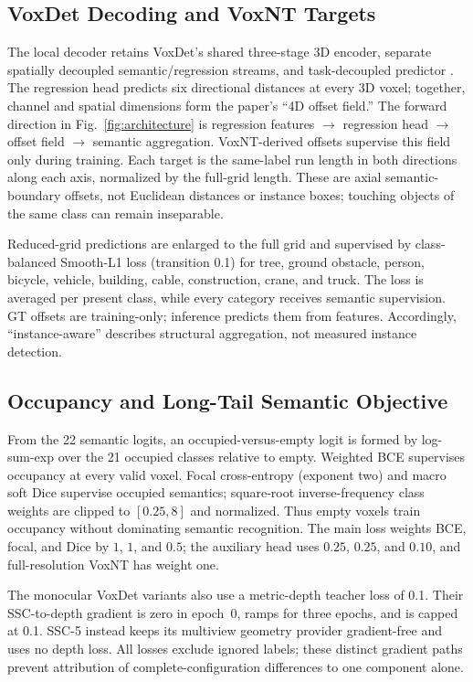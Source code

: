 \subsection{VoxDet Decoding and VoxNT Targets}
The local decoder retains VoxDet's shared three-stage 3D encoder, separate spatially decoupled semantic/regression streams, and task-decoupled predictor \cite{li2025voxdet}. The regression head predicts six directional distances at every 3D voxel; together, channel and spatial dimensions form the paper's ``4D offset field.'' The forward direction in Fig.~\ref{fig:architecture} is regression features $\rightarrow$ regression head $\rightarrow$ offset field $\rightarrow$ semantic aggregation. VoxNT-derived offsets supervise this field only during training. Each target is the same-label run length in both directions along each axis, normalized by the full-grid length. These are axial semantic-boundary offsets, not Euclidean distances or instance boxes; touching objects of the same class can remain inseparable.

Reduced-grid predictions are enlarged to the full grid and supervised by class-balanced Smooth-L1 loss (transition 0.1) for tree, ground obstacle, person, bicycle, vehicle, building, cable, construction, crane, and truck. The loss is averaged per present class, while every category receives semantic supervision. GT offsets are training-only; inference predicts them from features. Accordingly, ``instance-aware'' describes structural aggregation, not measured instance detection.

\subsection{Occupancy and Long-Tail Semantic Objective}
From the 22 semantic logits, an occupied-versus-empty logit is formed by log-sum-exp over the 21 occupied classes relative to empty. Weighted BCE supervises occupancy at every valid voxel. Focal cross-entropy (exponent two) and macro soft Dice supervise occupied semantics; square-root inverse-frequency class weights are clipped to $[0.25,8]$ and normalized. Thus empty voxels train occupancy without dominating semantic recognition. The main loss weights BCE, focal, and Dice by $1$, $1$, and $0.5$; the auxiliary head uses $0.25$, $0.25$, and $0.10$, and full-resolution VoxNT has weight one.

The monocular VoxDet variants also use a metric-depth teacher loss of 0.1. Their SSC-to-depth gradient is zero in epoch~0, ramps for three epochs, and is capped at 0.1. SSC-5 instead keeps its multiview geometry provider gradient-free and uses no depth loss. All losses exclude ignored labels; these distinct gradient paths prevent attribution of complete-configuration differences to one component alone.
